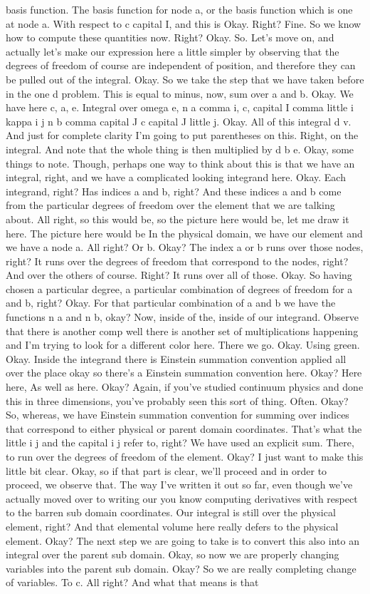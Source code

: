 \documentclass[10pt]{article}
\begin{document}
basis function. The basis function for node a, or the basis function which is one at node a. With respect to c capital I, and this is Okay. Right? Fine. So we know how to compute these quantities now. Right? Okay. So. Let's move on, and actually let's make our expression here a little simpler by observing that the degrees of freedom of course are independent of position, and therefore they can be pulled out of the integral. Okay. So we take the step that we have taken before in the one d problem. This is equal to minus, now, sum over a and b. Okay. We have here c, a, e. Integral over omega e, n a comma i, c, capital I comma little i kappa i j n b comma capital J c capital J little j. Okay. All of this integral d v. And just for complete clarity I'm going to put parentheses on this. Right, on the integral. And note that the whole thing is then multiplied by d b e. Okay, some things to note. Though, perhaps one way to think about this is that we have an integral, right, and we have a complicated looking integrand here. Okay. Each integrand, right? Has indices a and b, right? And these indices a and b come from the particular degrees of freedom over the element that we are talking about. All right, so this would be, so the picture here would be, let me draw it here. The picture here would be In the physical domain, we have our element and we have a node a. All right? Or b. Okay? The index a or b runs over those nodes, right? It runs over the degrees of freedom that correspond to the nodes, right? And over the others of course. Right? It runs over all of those. Okay. So having chosen a particular degree, a particular combination of degrees of freedom for a and b, right? Okay. For that particular combination of a and b we have the functions n a and n b, okay? Now, inside of the, inside of our integrand. Observe that there is another comp well there is another set of multiplications happening and I'm trying to look for a different color here. There we go. Okay. Using green. Okay. Inside the integrand there is Einstein summation convention applied all over the place okay so there's a Einstein summation convention here. Okay? Here here, As well as here. Okay? Again, if you've studied continuum physics and done this in three dimensions, you've probably seen this sort of thing. Often. Okay? So, whereas, we have Einstein summation convention for summing over indices that correspond to either physical or parent domain coordinates. That's what the little i j and the capital i j refer to, right? We have used an explicit sum. There, to run over the degrees of freedom of the element. Okay? I just want to make this little bit clear. Okay, so if that part is clear, we'll proceed and in order to proceed, we observe that. The way I've written it out so far, even though we've actually moved over to writing our you know computing derivatives with respect to the barren sub domain coordinates. Our integral is still over the physical element, right? And that elemental volume here really defers to the physical element. Okay? The next step we are going to take is to convert this also into an integral over the parent sub domain. Okay, so now we are properly changing variables into the parent sub domain. Okay? So we are really completing change of variables. To c. All right? And what that means is that 
\end{document}
